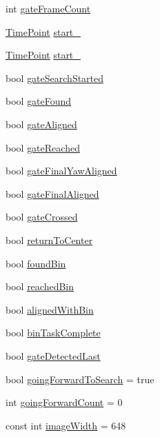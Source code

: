 \begin{DoxyCompactItemize}
int \hyperlink{classPathPlanner_a1807065a92d2188817a495bf89195132}{gate\+Frame\+Count}
\item 
\hyperlink{thruster__driver_8cpp_ad3e807c387dc076de974ff7eac67ad81}{Time\+Point} \hyperlink{classPathPlanner_a69d65cdba15fc71183ac337212b9c33f}{start\+\_}
\item 
\hyperlink{thruster__driver_8cpp_ad3e807c387dc076de974ff7eac67ad81}{Time\+Point} \hyperlink{classPathPlanner_afbb083470238dda8254a9d60032ae6d3}{start\+\_}
\item 
bool \hyperlink{classPathPlanner_a4bd99311cef29b79bc2d016ad0977d76}{gate\+Search\+Started}
\item 
bool \hyperlink{classPathPlanner_a3ed3d7942b9417d48ff9aa520493a241}{gate\+Found}
\item 
bool \hyperlink{classPathPlanner_afa8a249b6baf8ec217082eca1c1dc0f9}{gate\+Aligned}
\item 
bool \hyperlink{classPathPlanner_a30b4a90a40e1725347b19a521fd2e085}{gate\+Reached}
\item 
bool \hyperlink{classPathPlanner_ae30224fe26e2e73e0ffff2469ce0d885}{gate\+Final\+Yaw\+Aligned}
\item 
bool \hyperlink{classPathPlanner_a7231798c51e6e722389795cca59ec16e}{gate\+Final\+Aligned}
\item 
bool \hyperlink{classPathPlanner_a07768a73e0b9edc93611d12df1d2f20d}{gate\+Crossed}
\item 
bool \hyperlink{classPathPlanner_acbee7c3c100b1b1b7d0f946100953db7}{return\+To\+Center}
\item 
bool \hyperlink{classPathPlanner_ac649564f82726f564a0e4b1446886c5d}{found\+Bin}
\item 
bool \hyperlink{classPathPlanner_a30fb3f87413d9204db076f92b8df064f}{reached\+Bin}
\item 
bool \hyperlink{classPathPlanner_a61566d814449039efd5feaec4ebd217a}{aligned\+With\+Bin}
\item 
bool \hyperlink{classPathPlanner_a7c037b4370ae019db2950d0bbb20b885}{bin\+Task\+Complete}
\item 
bool \hyperlink{classPathPlanner_a8550d5f0f5e6840d74c482e8c9ec4f17}{gate\+Detected\+Last}
\item 
bool \hyperlink{classPathPlanner_ac4737618f7b977a760c4044c8c11d978}{going\+Forward\+To\+Search} = true
\item 
int \hyperlink{classPathPlanner_a5882e35e164ea48ba9c45325bd0eeb74}{going\+Forward\+Count} = 0
\item 
const int \hyperlink{classPathPlanner_ab562d2e58308fd42088587858d7193ab}{image\+Width} = 648

\end{DoxyCompactItemize}
